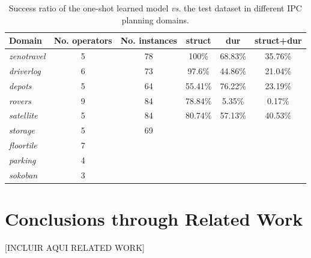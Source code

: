 \documentclass[runningheads]{llncs}
\begin{document}
\begin{table}
\begin{center}
\small
\begin{tabular}{p{2cm}ccccc}
Domain & No. operators & No. instances & struct & dur & struct+dur  \\

\hline

\emph{zenotravel} & 5 & 78 & 100\% & 68.83\% & 35.76\% \\
\emph{driverlog} & 6 & 73 & 97.6\% & 44.86\% & 21.04\% \\
\emph{depots} & 5 & 64 & 55.41\% & 76.22\% & 23.19\% \\
\emph{rovers} & 9 & 84 & 78.84\% & 5.35\% & 0.17\% \\
\emph{satellite} & 5 & 84 & 80.74\% & 57.13\% & 40.53\% \\
\emph{storage} & 5 & 69 & \\

\emph{floortile} & 7 &\\
\emph{parking} & 4 &\\
\emph{sokoban} & 3 & \\

\hline
\end{tabular}
\normalsize
\end{center}
\caption{Success ratio of the one-shot learned model \emph{vs.} the test dataset in different IPC planning domains.}
\label{table:evaluationExperiments}
\end{table}






\section{Conclusions through Related Work}
\label{sec:conclusions}

[INCLUIR AQUI RELATED WORK]
\end{document}
